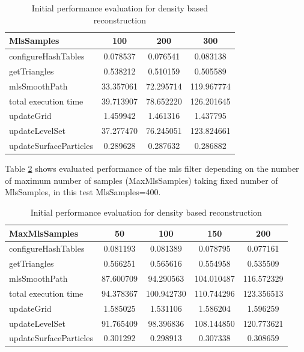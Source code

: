 \begin{table}[H]
	\begin{center}
		\scriptsize
		\begin{tabular}{|l|c|c|c|}
			\hline
			MlsSamples & 100 & 200 & 300 \\
			\hline
			configureHashTables		&	0.078537	&	0.076541	&	0.083138\\
			getTriangles			&	0.538212	&	0.510159	&	0.505589\\
			mlsSmoothPath			&	33.357061	&	72.295714	&	119.967774\\
			total execution time	&	39.713907	&	78.652220	&	126.201645\\
			updateGrid				&	1.459942	&	1.461316	&	1.437795\\
			updateLevelSet			&	37.277470	&	76.245051	&	123.824661\\
			updateSurfaceParticles	&	0.289628	&	0.287632	&	0.286882\\
			\hline
		\end{tabular}
	\end{center}
	\caption{Initial performance evaluation for density based reconstruction}
	\label{tab:mls_ms_perf}
\end{table}
Table \ref{tab:mls_mms_perf} shows evaluated performance of the mls filter depending on the number of maximum number of samples  (MaxMlsSamples) taking fixed number of MlsSamples, in this test MlsSamples=400.
\begin{table}[H]
	\begin{center}
		\scriptsize
		\begin{tabular}{|l|c|c|c|c|}
			\hline
			MaxMlsSamples & 50 & 100 & 150 & 200 \\
			\hline
			configureHashTables     	& 0.081193	&	0.081389	& 0.078795		& 0.077161\\
			getTriangles    			& 0.566251	&	0.565616	& 0.554958		& 0.535509\\
			mlsSmoothPath   			& 87.600709	&	94.290563	& 104.010487	& 116.572329\\
			total execution time    	& 94.378367	&	100.942730	& 110.744296	& 123.356513\\
			updateGrid      			& 1.585025	&	1.531106	& 1.586204		& 1.596259\\
			updateLevelSet  			& 91.765409	&	98.396836	& 108.144850	& 120.773621\\
			updateSurfaceParticles  	& 0.301292	&	0.298913	& 0.307338		& 0.308659\\
			\hline
		\end{tabular}
	\end{center}
	\caption{Initial performance evaluation for density based reconstruction}
	\label{tab:mls_mms_perf}
\end{table}
